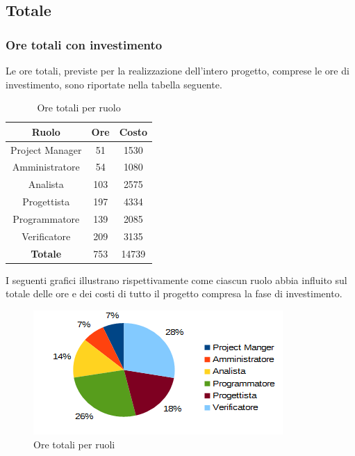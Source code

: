 	\subsection{Totale}
		\subsubsection{Ore totali con investimento}
		Le ore totali, previste per la realizzazione dell'intero progetto, comprese le ore di investimento, sono riportate nella tabella seguente. \\
		\begin{table}[H]
		\centering
		\begin{tabular}{|c|c|c|}
			\hline
			\textbf{Ruolo}		& \textbf{Ore}	& \textbf{Costo} \\
			\hline
			Project Manager		& 51			& 1530	\\
			Amministratore		& 54			& 1080	\\
			Analista			& 103			& 2575	\\
			Progettista			& 197			& 4334	\\
			Programmatore		& 139			& 2085	\\
			Verificatore		& 209			& 3135	\\
			\hline
			\textbf{Totale}		& 753			& 14739	\\
			\hline
		\end{tabular}
		\caption{Ore totali per ruolo}
		\end{table}
		I seguenti grafici illustrano rispettivamente come ciascun ruolo abbia influito sul totale delle ore e dei costi di tutto il progetto compresa la fase di investimento. \\
		\begin{figure}[H]
		\centering
			\includegraphics[width=1\linewidth]{immagini/grafici/riepilogo_conclusivo-torta.png}
			\caption{Ore totali per ruoli}
		\end{figure}
